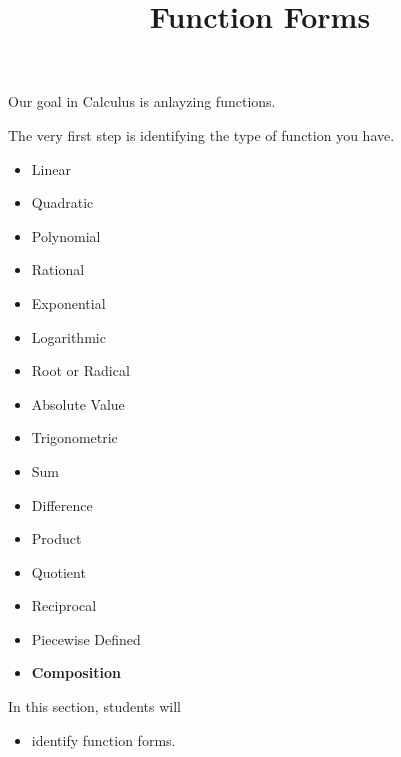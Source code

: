 \documentclass{ximera}
\title{Function Forms}
\begin{document}
\begin{abstract}
%
\end{abstract}
\maketitle



Our goal in Calculus is anlayzing functions.

The very first step is identifying the type of function you have.


\begin{itemize}
\item Linear
\item Quadratic
\item Polynomial
\item Rational
\item Exponential
\item Logarithmic
\item Root or Radical
\item Absolute Value
\item Trigonometric
\end{itemize}

\begin{itemize}
\item Sum
\item Difference
\item Product
\item Quotient
\item Reciprocal
\end{itemize}

\begin{itemize}
\item Piecewise Defined
\end{itemize}


\begin{itemize}
\item \textbf{\textcolor{red!80!black}{Composition}}
\end{itemize}




\begin{sectionOutcomes}
In this section, students will 

\begin{itemize}
\item identify function forms.
\end{itemize}
\end{sectionOutcomes}
\end{document}
